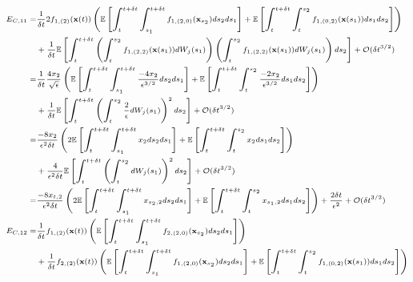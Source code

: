 \begin{equation}
\scriptsize
\begin{aligned}
E_{C,11}
=& 
\frac{1}{\delta t} 2 f_{1,(2)}(\mathbf{x}(t)) \left( \mathbb{E} \left[ \int_t^{t+\delta t} \int_{s_1}^{t+\delta t} f_{1,(2,0)}(\mathbf{x}_{s_2}) ds_2 ds_1 \right] 
+ \mathbb{E} \left[  \int_t^{t+\delta t} \int_t^{s_2} f_{1,(0,2)}(\mathbf{x}(s_1)) ds_1 ds_2\right] \right) \\
&+ \frac{1}{\delta t}  \mathbb{E} \left[ \int_t^{t+\delta t}\left( \int_t^{s_2} f_{1,(2,2)}(\mathbf{x}(s_1)) dW_j(s_1)  \right) \left(  \int_t^{s_2} f_{1,(2,2)}(\mathbf{x}(s_1)) dW_j(s_1) \right) ds_2 \right] 
+ \mathcal{O} (\delta t^{3/2}) \\
=& 
\frac{1}{\delta t}  \frac{4 x_2}{\sqrt{\epsilon}} \left( \mathbb{E} \left[ \int_t^{t+\delta t} \int_{s_1}^{t+\delta t} \frac{-4 x_2}{\epsilon^{3/2}} ds_2 ds_1 \right] 
+ \mathbb{E} \left[  \int_t^{t+\delta t} \int_t^{s_2} \frac{-2 x_2}{\epsilon^{3/2}} ds_1 ds_2\right] \right) \\
&+ \frac{1}{\delta t} \mathbb{E} \left[ \int_t^{t+\delta t}\left( \int_t^{s_2} \frac{2}{\epsilon} dW_j(s_1)  \right)^2 ds_2 \right] 
+ \mathcal{O} (\delta t^{3/2}) \\
=& 
\frac{-8 x_2}{\epsilon^2 \delta t} \left( 2 \mathbb{E} \left[ \int_t^{t+\delta t} \int_{s_1}^{t+\delta t} x_2 ds_2 ds_1 \right] 
+ \mathbb{E} \left[  \int_t^{t+\delta t} \int_t^{s_2} x_2 ds_1 ds_2\right] \right) \\
&+ \frac{4}{\epsilon^2 \delta t} \mathbb{E} \left[ \int_t^{t+\delta t}\left( \int_t^{s_2} dW_j(s_1)  \right)^2 ds_2 \right] 
+ \mathcal{O} (\delta t^{3/2}) \\
=& 
\frac{-8 x_{t,2}}{\epsilon^2 \delta t} \left( 2 \mathbb{E} \left[ \int_t^{t+\delta t} \int_{s_1}^{t+\delta t} x_{s_2,2} ds_2 ds_1 \right] 
+ \mathbb{E} \left[  \int_t^{t+\delta t} \int_t^{s_2} x_{s_1,2} ds_1 ds_2\right] \right) 
+ \frac{2 \delta t}{\epsilon^2} 
+ \mathcal{O} (\delta t^{3/2}) \\
%
E_{C, 12} 
=& 
\frac{1}{\delta t}  f_{1,(2)}(\mathbf{x}(t)) \left( \mathbb{E} \left[ \int_t^{t+\delta t} \int_{s_1}^{t+\delta t} f_{2,(2,0)}(\mathbf{x}_{s_2}) ds_2 ds_1 \right]  \right) \\
&+ \frac{1}{\delta t} f_{2,(2)}(\mathbf{x}(t)) \left( \mathbb{E} \left[ \int_t^{t+\delta t} \int_{s_1}^{t + \delta t} f_{1,(2,0)}(\mathbf{x}_{s_2}) ds_2 ds_1 \right]
+ \mathbb{E} \left[ \int_t^{t+\delta t} \int_t^{s_2} f_{1,(0,2)}(\mathbf{x}(s_1)) ds_1 ds_2 \right] \right) \\

\end{aligned}
\end{equation}
